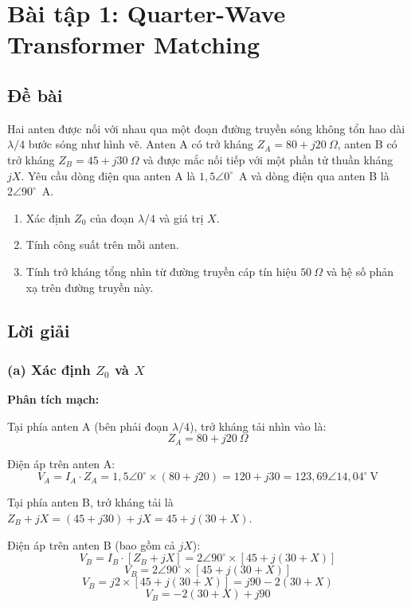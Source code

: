 \documentclass[12pt,a4paper]{article}
\begin{document}
\section{Bài tập 1: Quarter-Wave Transformer Matching}

\subsection{Đề bài}
Hai anten được nối với nhau qua một đoạn đường truyền sóng không tổn hao dài $\lambda/4$ bước sóng như hình vẽ. Anten A có trở kháng $Z_A = 80 + j20~\Omega$, anten B có trở kháng $Z_B = 45 + j30~\Omega$ và được mắc nối tiếp với một phần tử thuần kháng $jX$. Yêu cầu dòng điện qua anten A là $1{,}5\angle 0^\circ$~A và dòng điện qua anten B là $2\angle 90^\circ$~A.

\begin{enumerate}
    \item[(a)] Xác định $Z_0$ của đoạn $\lambda/4$ và giá trị $X$.
    \item[(b)] Tính công suất trên mỗi anten.
    \item[(c)] Tính trở kháng tổng nhìn từ đường truyền cáp tín hiệu $50~\Omega$ và hệ số phản xạ trên đường truyền này.
\end{enumerate}

\subsection{Lời giải}

\subsubsection{(a) Xác định $Z_0$ và $X$}

\textbf{Phân tích mạch:}

Tại phía anten A (bên phải đoạn $\lambda/4$), trở kháng tải nhìn vào là:
\[
Z_A = 80 + j20~\Omega
\]

Điện áp trên anten A:
\[
V_A = I_A \cdot Z_A = 1{,}5\angle 0^\circ \times (80 + j20) = 120 + j30 = 123{,}69\angle 14{,}04^\circ~\text{V}
\]

Tại phía anten B, trở kháng tải là $Z_B + jX = (45 + j30) + jX = 45 + j(30 + X)$.

Điện áp trên anten B (bao gồm cả $jX$):
\[
V_B = I_B \cdot [Z_B + jX] = 2\angle 90^\circ \times [45 + j(30 + X)]
\]
\[
V_B = 2\angle 90^\circ \times [45 + j(30 + X)]
\]
\[
V_B = j2 \times [45 + j(30 + X)] = j90 - 2(30 + X)
\]
\[
V_B = -2(30 + X) + j90
\]
\end{document}
